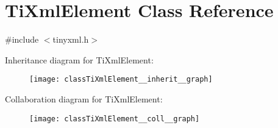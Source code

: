 \hypertarget{classTiXmlElement}{}\section{Ti\+Xml\+Element Class Reference}
\label{classTiXmlElement}


{\ttfamily \#include $<$tinyxml.\+h$>$}



Inheritance diagram for Ti\+Xml\+Element\+:\nopagebreak
\begin{figure}[H]
\begin{center}
\leavevmode
\texttt{[image: classTiXmlElement\_\_inherit\_\_graph]}
\end{center}
\end{figure}


Collaboration diagram for Ti\+Xml\+Element\+:\nopagebreak
\begin{figure}[H]
\begin{center}
\leavevmode
\texttt{[image: classTiXmlElement\_\_coll\_\_graph]}
\end{center}
\end{figure}
